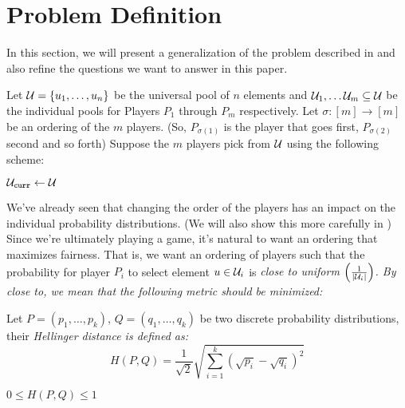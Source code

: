 \section{Problem Definition}\label{Sec:Problem-Definition}

In this section, we will present a generalization of the problem described in  and also refine the questions we want to answer in this paper.

Let $\mathcal{U} = \{u_1, \ldots, u_n\}$ be the universal pool of $n$ elements and $\mathcal{U}_1, \ldots \mathcal{U}_m \subseteq \mathcal{U}$ be the individual pools for Players $P_1$ through $P_m$ respectively.
Let $\sigma: [m] \longrightarrow [m]$ be an ordering of the $m$ players.
(So, $P_{\sigma(1)}$ is the player that goes first, $P_{\sigma(2)}$ second and so forth)
Suppose the $m$ players pick from $\mathcal{U}$ using the following scheme:

\IncMargin{2em}
\begin{algorithm}[H]
    
    \BlankLine
    \BlankLine

    $\mathcal{U}_{\mathtt{curr}} \leftarrow \mathcal{U}$

\end{algorithm}
\DecMargin{2em}

We've already seen that changing the order of the players has an impact on the individual probability distributions.
(We will also show this more carefully in )
Since we're ultimately playing a game, it's natural to want an ordering that maximizes fairness.
That is, we want an ordering of players such that the probability for player $P_i$ to select element $u \in \mathcal{U}_i$ is \it{close to} uniform $\left(\frac{1}{|\mathcal{U}_i|}\right)$.
By \it{close to}, we mean that the following metric should be minimized:

\begin{definition}[Hellinger Distance\footnote{See \url{http://encyclopediaofmath.org/index.php?title=Hellinger_distance&oldid=47206}}]
    Let $P = (p_1, \ldots, p_k)$, $Q = (q_1, \ldots, q_k)$ be two discrete probability distributions, their \it{Hellinger distance} is defined as:
    \[
        H(P, Q) = \frac{1}{\sqrt{2}}\sqrt{\sum_{i = 1}^k (\sqrt{p_i} - \sqrt{q_i})^2}
    \]
\end{definition}
\begin{remark}
    $0 \leq H(P,Q) \leq 1$ 
\end{remark}

